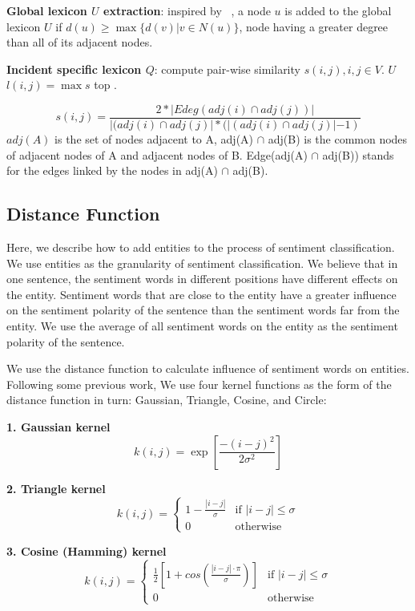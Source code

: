 \documentclass[runningheads]{llncs}
\begin{document}
\textbf{Global lexicon $U$ extraction}: inspired by ~\cite{Zhang2012corenodes}, a node $u$ is added to the global lexicon $U$ if $d(u)\geq \max\{d(v)|v\in N(u)\}$,  node having a greater degree than all of its adjacent nodes. 

\textbf{Incident specific lexicon $Q$}: compute pair-wise similarity $s(i,j), i,j\in V$. $U$ $l(i,j)=\max {s}$ top . 

\begin{equation}
    s(i,j) = \frac{2*|Edeg(adj(i)\cap adj(j))|}{|(adj(i)\cap adj(j)|*(|(adj(i)\cap adj(j)|-1)}
\end{equation}
$adj(A)$ is the set of nodes adjacent to A, adj(A) $\cap$ adj(B) is the common nodes of adjacent nodes of A and adjacent nodes of B. Edge(adj(A) $\cap$ adj(B)) stands for the edges linked by the nodes in adj(A) $\cap$ adj(B).%


\subsection{Distance Function}
Here, we describe how to add entities to the process of sentiment classification. We use entities as the granularity of sentiment classification. We believe that in one sentence, the sentiment words in different positions have different effects on the entity. Sentiment words that are close to the entity have a greater influence on the sentiment polarity of the sentence than the sentiment words far from the entity. We use the average of all sentiment words on the entity as the sentiment polarity of the sentence.

We use the distance function to calculate influence of sentiment words on entities. Following some previous work, We use four kernel functions as the form of the distance function in turn: Gaussian, Triangle, Cosine, and Circle:

\textbf{1. Gaussian kernel}
\begin{equation}
    k(i,j) = \exp\left[\frac{-(i-j)^2}{2\sigma^2}\right]
\end{equation}

\textbf{2. Triangle kernel}
\begin{equation}
k(i,j)=\begin{cases}
1-\frac{|i-j|}{\sigma} &\mbox{if $|i-j|\leq \sigma$}\\
0 &\mbox{otherwise}
\end{cases}
\end{equation}

\textbf{3. Cosine (Hamming) kernel}
\begin{equation}
k(i,j)=\begin{cases}
\frac{1}{2}\left[1+cos\left(\frac{|i-j|\cdot\pi}{\sigma}\right)\right] &\mbox{if $|i-j|\leq \sigma$}\\
0 &\mbox{otherwise}
\end{cases}
\end{equation}
\end{document}
